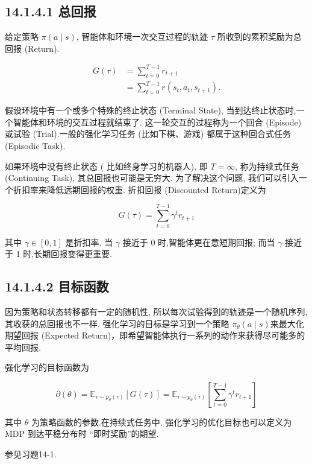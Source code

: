 \documentclass[10pt]{article}
\begin{document}
\subsection*{14.1.4.1 总回报}
给定策略 $\pi(a \mid s)$, 智能体和环境一次交互过程的轨迹 $\tau$ 所收到的累积奖励为总回报 (Return).


\begin{align*}
G(\tau) & =\sum_{t=0}^{T-1} r_{t+1}  \tag{14.8}\\
& =\sum_{t=0}^{T-1} r\left(s_{t}, a_{t}, s_{t+1}\right) . \tag{14.9}
\end{align*}


假设环境中有一个或多个特殊的终止状态 (Terminal State), 当到达终止状态时,一个智能体和环境的交互过程就结束了. 这一轮交互的过程称为一个回合 (Episode) 或试验 (Trial).一般的强化学习任务 (比如下棋、游戏) 都属于这种回合式任务 (Episodic Task).

如果环境中没有终止状态 ( 比如终身学习的机器人), 即 $T=\infty$, 称为持续式任务 (Continuing Task), 其总回报也可能是无穷大. 为了解决这个问题, 我们可以引入一个折扣率来降低远期回报的权重. 折扣回报 (Discounted Return)定义为


\begin{equation*}
G(\tau)=\sum_{t=0}^{T-1} \gamma^{t} r_{t+1} \tag{14.10}
\end{equation*}


其中 $\gamma \in[0,1]$ 是折扣率. 当 $\gamma$ 接近于 0 时,智能体更在意短期回报; 而当 $\gamma$ 接近于 1 时,长期回报变得更重要.

\subsection*{14.1.4.2 目标函数}
因为策略和状态转移都有一定的随机性, 所以每次试验得到的轨迹是一个随机序列, 其收获的总回报也不一样. 强化学习的目标是学习到一个策略 $\pi_{\theta}(a \mid s)$来最大化期望回报 (Expected Return)，即希望智能体执行一系列的动作来获得尽可能多的平均回报.

强化学习的目标函数为


\begin{equation*}
\mathcal{\partial}(\theta)=\mathbb{E}_{\tau \sim p_{\theta}(\tau)}[G(\tau)]=\mathbb{E}_{\tau \sim p_{\theta}(\tau)}\left[\sum_{t=0}^{T-1} \gamma^{t} r_{t+1}\right] \tag{14.11}
\end{equation*}


其中 $\theta$ 为策略函数的参数.在持续式任务中, 强化学习的优化目标也可以定义为 MDP 到达平稳分布时 “即时奖励”的期望.

参见习题14-1.
\end{document}
